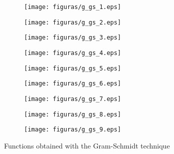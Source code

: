 \begin{figure}[H]
    \centering
    \begin{subfigure}[b]{0.3\linewidth}
        \texttt{[image: figuras/g\_gs\_1.eps]}
    \end{subfigure}
    \begin{subfigure}[b]{0.3\linewidth}
        \texttt{[image: figuras/g\_gs\_2.eps]}
    \end{subfigure}
    \begin{subfigure}[b]{0.3\linewidth}
        \texttt{[image: figuras/g\_gs\_3.eps]}
    \end{subfigure}
    \begin{subfigure}[b]{0.3\linewidth}
        \texttt{[image: figuras/g\_gs\_4.eps]}
    \end{subfigure}
    \begin{subfigure}[b]{0.3\linewidth}
        \texttt{[image: figuras/g\_gs\_5.eps]}
    \end{subfigure}
    \begin{subfigure}[b]{0.3\linewidth}
        \texttt{[image: figuras/g\_gs\_6.eps]}
    \end{subfigure}
    \begin{subfigure}[b]{0.3\linewidth}
        \texttt{[image: figuras/g\_gs\_7.eps]}
    \end{subfigure}
    \begin{subfigure}[b]{0.3\linewidth}
        \texttt{[image: figuras/g\_gs\_8.eps]}
    \end{subfigure}
    \begin{subfigure}[b]{0.3\linewidth}
        \texttt{[image: figuras/g\_gs\_9.eps]}
    \end{subfigure}
    \caption{Functions obtained with the Gram-Schmidt technique}
    \label{fig:gs_gaussians}
\end{figure}

